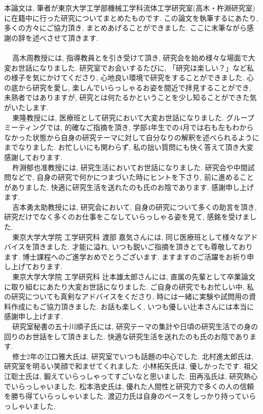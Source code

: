 本論文は, 筆者が東京大学工学部機械工学科流体工学研究室(高木・杵淵研究室)に在籍中に行った研究についてまとめたものです. この論文を執筆するにあたり, 多くの方々にご協力頂き, まとめあげることができました. ここに末筆ながら感謝の辞を述べさせて頂きます.
\\
\\\ \ \,高木周教授には, 指導教員とを引き受けて頂き, 研究会を始め様々な場面で大変お世話になりました. 研究室でお会いするたびに, 「研究は楽しい？」など私の様子を気にかけてくださり, 心地良い環境で研究をすることができました. 心の底から研究を愛し, 楽しんでいらっしゃるお姿を間近で拝見することができ, 未熟者ではありますが, 研究とは何たるかということを少し知ることができた気がいたします.
\\\ \ \,東隆教授には, 医療班として研究において大変お世話になりました. グループミーティングでは, 的確なご指摘を頂き, 学部4年生での4月では右も左もわからなかった状態から自身の研究テーマに対して自分なりの解釈を述べられるようにまでなりました. お忙しいにも関わらず, 私の拙い質問にも快く答えて頂き大変感謝しております. 
\\\ \ \,杵淵郁也准教授には, 研究生活においてお世話になりました. 研究会や中間試問などで, 自身の研究で何かにつまづいた時にヒントを下さり, 前に進めることがありました. 快適に研究生活を送れたのも氏のお陰であります. 感謝申し上げます. 
\\\ \ \,吉本勇太助教授には, 研究会において, 自身の研究について多くの助言を頂き, 研究だけでなく多くのお仕事をこなしていらっしゃる姿を見て, 感銘を受けました. 
\\\ \ \,東京大学大学院 工学研究科 渡部 嘉気さんには, 同じ医療班として様々なアドバイスを頂きました. 才能に溢れ, いつも鋭いご指摘を頂きとても尊敬しております. 博士課程へのご進学おめでとうございます. ますますのご活躍をお祈り申し上げております. 
\\\ \ \,東京大学大学院 工学研究科 辻本雄太郎さんには, 直属の先輩として卒業論文に取り組むにあたり大変お世話になりました. ご自身の研究でもお忙しい中, 私の研究についても真剣なアドバイスをくださり, 時には一緒に実験や試問用の資料作成にもご協力頂きました. お話も楽しく, いつも優しい辻本さんには本当に感謝申し上げます. 
\\\ \ \,研究室秘書の五十川順子氏には, 研究テーマの集計や日頃の研究生活での身の回りのお世話をして頂きました. 快適な研究生活を送れたのも氏のお陰であります. 
\\\ \ \,修士2年の江口雅大氏は, 研究室でいつも話題の中心でした. 北村進太郎氏は, 研究室を明るい笑顔で和ませてくれました. 小林拓矢氏は, 優しかったです. 祖父江聡士氏は, 鍛えていらっしゃってすごいなと思いました. 田再泓氏は, 研究熱心でいらっしゃいました. 松本浩史氏は, 優れた人間性と研究力で多くの人の信頼を勝ち得ていらっしゃいました. 渡辺力氏は自身のペースをしっかり持っていらっしゃいました. 
